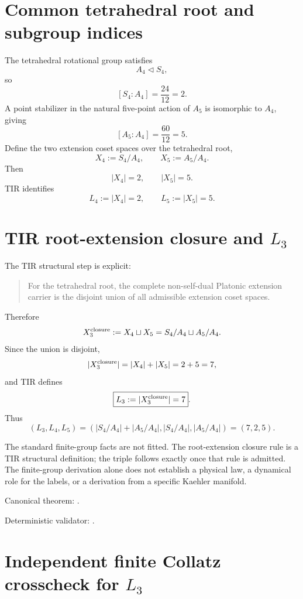 \section{Common tetrahedral root and subgroup indices}

The tetrahedral rotational group satisfies
\[
A_4\triangleleft S_4,
\]
so
\[
\boxed{[S_4:A_4]=\frac{24}{12}=2}.
\]
A point stabilizer in the natural five-point action of \(A_5\) is isomorphic to
\(A_4\), giving
\[
\boxed{[A_5:A_4]=\frac{60}{12}=5}.
\]
Define the two extension coset spaces over the tetrahedral root,
\[
X_4:=S_4/A_4,
\qquad
X_5:=A_5/A_4.
\]
Then
\[
|X_4|=2,
\qquad
|X_5|=5.
\]
TIR identifies
\[
\boxed{L_4:=|X_4|=2},
\qquad
\boxed{L_5:=|X_5|=5}.
\]

\section[TIR root-extension closure and L3]{TIR root-extension closure and $L_3$}

The TIR structural step is explicit:

\begin{quote}
For the tetrahedral root, the complete non-self-dual Platonic extension carrier
is the disjoint union of all admissible extension coset spaces.
\end{quote}

Therefore
\[
X_3^{\rm closure}:=X_4\sqcup X_5
=S_4/A_4\sqcup A_5/A_4.
\]
Since the union is disjoint,
\[
|X_3^{\rm closure}|=|X_4|+|X_5|=2+5=7,
\]
and TIR defines
\[
\boxed{L_3:=|X_3^{\rm closure}|=7}.
\]
Thus
\[
\boxed{
(L_3,L_4,L_5)
=\left(
|S_4/A_4|+|A_5/A_4|,
|S_4/A_4|,
|A_5/A_4|
\right)
=(7,2,5).
}
\]

The standard finite-group facts are not fitted.  The root-extension closure
rule is a TIR structural definition; the triple follows exactly once that rule
is admitted.  The finite-group derivation alone does not establish a physical
law, a dynamical role for the labels, or a derivation from a specific Kaehler
manifold.

Canonical theorem:
.

Deterministic validator:
.

\section[Independent finite Collatz crosscheck for L3]{Independent finite Collatz crosscheck for $L_3$}

